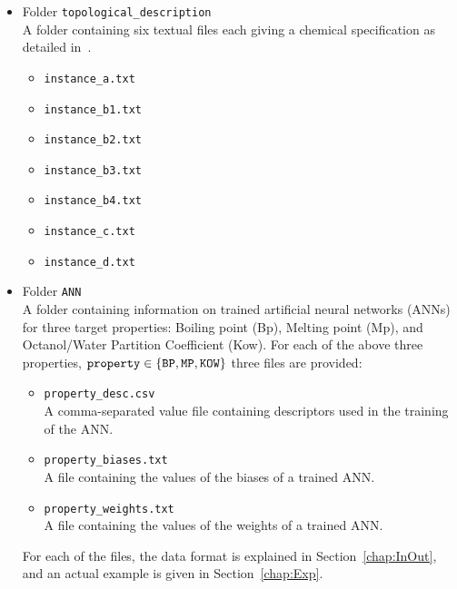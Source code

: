 \documentclass[11pt,titlepage,dvipdfmx,twoside]{book}
\begin{document}
{\begin{itemize}
\begin{itemize}
\item Folder {\tt topological\_description}\\
A folder containing six textual files each giving a chemical specification as detailed 
in~\cite{AN20}.
%
\begin{itemize}
 \item {\tt instance\_a.txt} 
 \item {\tt instance\_b1.txt} 
 \item {\tt instance\_b2.txt} 
 \item {\tt instance\_b3.txt}
 \item {\tt instance\_b4.txt}  
 \item {\tt instance\_c.txt} 
 \item {\tt instance\_d.txt} 
\end{itemize}

\item Folder {\tt ANN}\\
A folder containing information on trained artificial neural networks (ANNs) for three target properties:
Boiling point (Bp), Melting point (Mp), and Octanol/Water Partition Coefficient (Kow).
For each of the above three properties, ${\tt property} \in \{{\tt BP, MP, KOW}\}$ three files are provided:
%
\begin{itemize}
\item {\tt property\_desc.csv}\\
A comma-separated value file containing descriptors
used in the training of the ANN.

\item {\tt property\_biases.txt}\\
A file containing the values of the biases of a trained ANN.

\item {\tt property\_weights.txt}\\
A file containing the values of the weights of a trained ANN.
\end{itemize}
%
For each of the files, the data format is explained in Section~\ref{chap:InOut},
and an actual example is given in Section~\ref{chap:Exp}.

% 
%
\end{itemize}
\end{itemize}
}
\end{document}

